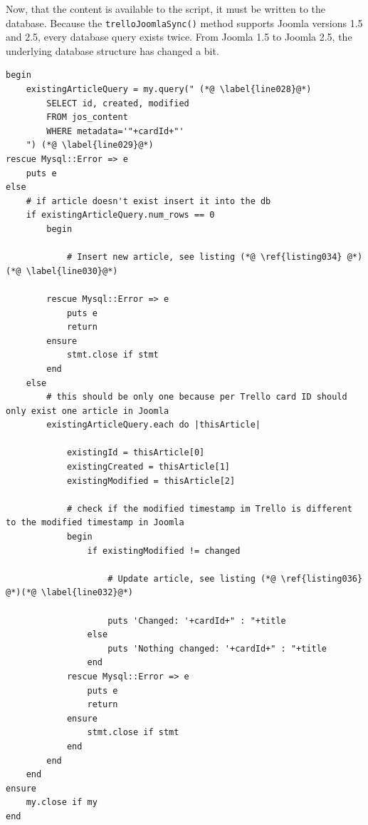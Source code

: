 Now, that the content is available to the script, it must be written to the database. Because the \lstinline{trelloJoomlaSync()} method supports Joomla versions 1.5 and 2.5, every database query exists twice. From Joomla 1.5 to Joomla 2.5, the underlying database structure has changed a bit. 

\begin{lstlisting}[aboveskip=1\baselineskip, caption=\texttt{joomlaMultiple.rb} usage., label=listing033]
begin  
	existingArticleQuery = my.query(" (*@ \label{line028}@*)
		SELECT id, created, modified
		FROM jos_content 
		WHERE metadata='"+cardId+"'
	") (*@ \label{line029}@*)
rescue Mysql::Error => e
	puts e
else
	# if article doesn't exist insert it into the db
	if existingArticleQuery.num_rows == 0
		begin
			
			# Insert new article, see listing (*@ \ref{listing034} @*)(*@ \label{line030}@*)
			
		rescue Mysql::Error => e
			puts e
			return
		ensure
			stmt.close if stmt
		end			
	else
		# this should be only one because per Trello card ID should only exist one article in Joomla
		existingArticleQuery.each do |thisArticle|
			
			existingId = thisArticle[0]
			existingCreated = thisArticle[1]
			existingModified = thisArticle[2]
			
			# check if the modified timestamp im Trello is different to the modified timestamp in Joomla
			begin 
				if existingModified != changed
					
					# Update article, see listing (*@ \ref{listing036} @*)(*@ \label{line032}@*)
					
					puts 'Changed: '+cardId+" : "+title
				else 
					puts 'Nothing changed: '+cardId+" : "+title
				end					
			rescue Mysql::Error => e
				puts e
				return
			ensure
				stmt.close if stmt
			end
		end
	end	
ensure
	my.close if my
end
\end{lstlisting}


